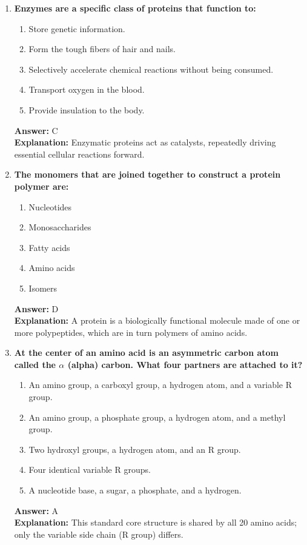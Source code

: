 \documentclass[11pt, a4paper]{article}
\begin{document}
\begin{enumerate}
\item \textbf{Enzymes are a specific class of proteins that function to:}
\begin{enumerate}[label=\Alph*.]
    \item Store genetic information.
    \item Form the tough fibers of hair and nails.
    \item Selectively accelerate chemical reactions without being consumed.
    \item Transport oxygen in the blood.
    \item Provide insulation to the body.
\end{enumerate}
\textbf{Answer:} C \\
\textbf{Explanation:} Enzymatic proteins act as catalysts, repeatedly driving essential cellular reactions forward.

\item \textbf{The monomers that are joined together to construct a protein polymer are:}
\begin{enumerate}[label=\Alph*.]
    \item Nucleotides
    \item Monosaccharides
    \item Fatty acids
    \item Amino acids
    \item Isomers
\end{enumerate}
\textbf{Answer:} D \\
\textbf{Explanation:} A protein is a biologically functional molecule made of one or more polypeptides, which are in turn polymers of amino acids.

\item \textbf{At the center of an amino acid is an asymmetric carbon atom called the $\alpha$ (alpha) carbon. What four partners are attached to it?}
\begin{enumerate}[label=\Alph*.]
    \item An amino group, a carboxyl group, a hydrogen atom, and a variable R group.
    \item An amino group, a phosphate group, a hydrogen atom, and a methyl group.
    \item Two hydroxyl groups, a hydrogen atom, and an R group.
    \item Four identical variable R groups.
    \item A nucleotide base, a sugar, a phosphate, and a hydrogen.
\end{enumerate}
\textbf{Answer:} A \\
\textbf{Explanation:} This standard core structure is shared by all 20 amino acids; only the variable side chain (R group) differs.


\end{enumerate}
\end{document}

